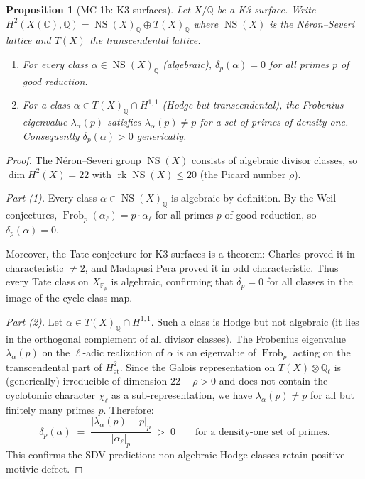 \documentclass[11pt]{article}
\newtheorem{proposition}[lemma]{Proposition}
\theoremstyle{definition}
\DeclareMathOperator{\Frob}{Frob}
\DeclareMathOperator{\rk}{rk}
\DeclareMathOperator{\NS}{NS}
\begin{document}
\begin{proposition}[MC-1b: K3 surfaces]
\label{prop:MC-1b}
Let $X/\mathbb{Q}$ be a K3 surface.  Write
$H^2(X(\mathbb{C}), \mathbb{Q}) = \NS(X)_{\mathbb{Q}} \oplus T(X)_{\mathbb{Q}}$
where $\NS(X)$ is the N\'eron--Severi lattice and $T(X)$ the transcendental lattice.
\begin{enumerate}
  \item For every class $\alpha \in \NS(X)_{\mathbb{Q}}$ (algebraic),
    $\delta_p(\alpha) = 0$ for all primes $p$ of good reduction.
  \item For a class $\alpha \in T(X)_{\mathbb{Q}} \cap H^{1,1}$ (Hodge but transcendental),
    the Frobenius eigenvalue $\lambda_\alpha(p)$ satisfies $\lambda_\alpha(p) \neq p$
    for a set of primes of density one.  Consequently $\delta_p(\alpha) > 0$ generically.
\end{enumerate}
\end{proposition}

\begin{proof}
The N\'eron--Severi group $\NS(X)$ consists of algebraic divisor classes,
so $\dim H^2(X) = 22$ with $\rk \NS(X) \leq 20$ (the Picard number $\rho$).

\emph{Part (1).}
Every class $\alpha \in \NS(X)_{\mathbb{Q}}$ is algebraic by definition.
By the Weil conjectures, $\Frob_p(\alpha_\ell) = p \cdot \alpha_\ell$ for all
primes $p$ of good reduction, so $\delta_p(\alpha) = 0$.

Moreover, the Tate conjecture for K3 surfaces is a theorem:
Charles \cite{Charles} proved it in characteristic $\neq 2$,
and Madapusi Pera \cite{MP} proved it in odd characteristic.
Thus every Tate class on $X_{\mathbb{F}_p}$ is algebraic,
confirming that $\delta_p = 0$ for all classes in the image of the cycle class map.

\emph{Part (2).}
Let $\alpha \in T(X)_{\mathbb{Q}} \cap H^{1,1}$.  Such a class is Hodge but not algebraic
(it lies in the orthogonal complement of all divisor classes).
The Frobenius eigenvalue $\lambda_\alpha(p)$ on the $\ell$-adic realization of $\alpha$
is an eigenvalue of $\Frob_p$ acting on the transcendental part of $H^2_{\mathrm{\acute{e}t}}$.
Since the Galois representation on $T(X) \otimes \mathbb{Q}_\ell$ is (generically)
irreducible of dimension $22 - \rho > 0$ and does not contain the cyclotomic character
$\chi_\ell$ as a sub-representation, we have $\lambda_\alpha(p) \neq p$
for all but finitely many primes $p$.  Therefore:
\[
  \delta_p(\alpha) \;=\; \frac{|\lambda_\alpha(p) - p|_p}{|\alpha_\ell|_p} \;>\; 0
  \qquad \text{for a density-one set of primes.}
\]
This confirms the SDV prediction: non-algebraic Hodge classes retain positive motivic defect.
\end{proof}
\end{document}

